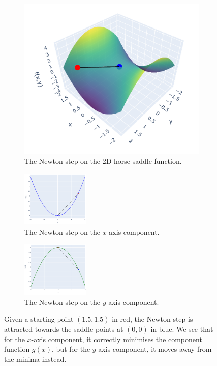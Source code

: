\begin{figure}[h]
    \begin{subfigure}[b]{0.33\linewidth}
        \centering
        \includegraphics[width=\linewidth]{figures/2background/attract1.png}
        \caption{The Newton step on the 2D horse saddle function.}
        \label{fig:2d_attract}
    \end{subfigure}
    \hfill
    \begin{subfigure}[b]{0.32\linewidth}
        \centering
        \includegraphics[width=\linewidth, height=100px]{figures/2background/attract2.png}
        \caption{The Newton step on the $x$-axis component.}
        \label{fig:x_attract}
    \end{subfigure}
    \hfill
    \begin{subfigure}[b]{0.33\linewidth}
        \centering
        \includegraphics[width=\linewidth, height=100px]{figures/2background/attract3.png}
        \caption{The Newton step on the $y$-axis component.}
        \label{fig:y_attract}
    \end{subfigure}
    \caption{Given a starting point $(1.5, 1.5)$ in red, the Newton step is attracted towards the saddle points at $(0, 0)$ in blue. We see that for the $x$-axis component, it correctly minimises the component function $g(x)$, but for the $y$-axis component, it moves away from the minima instead.}
    \label{fig:newton_attract}
\end{figure}


